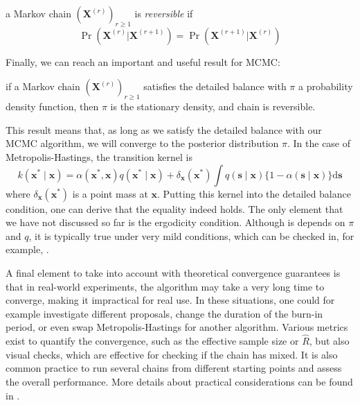 \documentclass[12pt]{memoir}
\newcommand{\mb}{\mathbf}
\newcommand{\ti}{\textit}
\begin{document}
\begin{boxedthm}
    a Markov chain $(\mb X^{(r)})_{r\geq1}$ is \ti{reversible} if
\begin{equation}
    \Pr(\mb X^{(r)} | \mb X^{(r+1)}) = \Pr(\mb X^{(r+1)} | \mb X^{(r)})
\end{equation}
\end{boxedthm}
Finally, we can reach an important and useful result for MCMC:

\begin{boxedthm}
    if a Markov chain $(\mb X^{(r)})_{r\geq1}$ satisfies the detailed balance with $\pi$ a probability density function, then $\pi$ is the stationary density, and chain is reversible.
\end{boxedthm}

This result means that, as long as we satisfy the detailed balance with our MCMC algorithm, we will converge to the posterior distribution $\pi$. In the case of Metropolis-Hastings, the transition kernel is 
\begin{equation}\label{eq:mh-transition-kernel}
    k\left(\boldsymbol{x}^* \mid \boldsymbol{x}\right)=\alpha\left(\boldsymbol{x}^*, \boldsymbol{x}\right) q\left(\boldsymbol{x}^* \mid \boldsymbol{x}\right)+\delta_{\boldsymbol{x}}\left(\boldsymbol{x}^*\right) \int q(\boldsymbol{s} \mid \boldsymbol{x})\{1-\alpha(\boldsymbol{s} \mid \boldsymbol{x})\} \mathrm{d} \boldsymbol{s}
\end{equation}
where $\delta_{\mb x}(\mb x^*)$ is a point mass at $\mb x$. Putting this kernel into the detailed balance condition, one can derive that the equality indeed holds. The only element that we have not discussed so far is the ergodicity condition. Although is depends on $\pi$ and $q$, it is typically true under very mild conditions, which can be checked in, for example, \cite{mcmc:RobertCasella2004}.\medbreak

A final element to take into account with theoretical convergence guarantees is that in real-world experiments, the algorithm may take a very long time to converge, making it impractical for real use. In these situations, one could for example investigate different proposals, change the duration of the burn-in period, or even swap Metropolis-Hastings for another algorithm. Various metrics exist to quantify the convergence, such as the effective sample size or $\hat R$, but also visual checks, which are effective for checking if the chain has mixed. It is also common practice to run several chains from different starting points and assess the overall performance. More details about practical considerations can be found in \cite{mcmc:gelman2013bayesian}.
\end{document}
